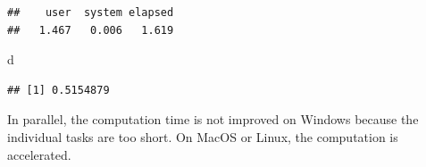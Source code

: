 \documentclass[
  12pt,
  american,
  a4paper,
  extrafontsizes,onecolumn,openright
  ]{memoir}
\newenvironment{Shaded}{\begin{snugshade}}{\end{snugshade}}
\newcommand{\ControlFlowTok}[1]{\textcolor[rgb]{0.13,0.29,0.53}{\textbf{#1}}}
\newcommand{\DecValTok}[1]{\textcolor[rgb]{0.00,0.00,0.81}{#1}}
\newcommand{\FunctionTok}[1]{\textcolor[rgb]{0.13,0.29,0.53}{\textbf{#1}}}
\newcommand{\NormalTok}[1]{#1}
\newcommand{\OtherTok}[1]{\textcolor[rgb]{0.56,0.35,0.01}{#1}}
\newcommand{\SpecialCharTok}[1]{\textcolor[rgb]{0.81,0.36,0.00}{\textbf{#1}}}
\begin{document}
\scriptsize

\begin{Shaded}
\end{Shaded}

\begin{verbatim}
##    user  system elapsed 
##   1.467   0.006   1.619
\end{verbatim}

\begin{Shaded}
\begin{Highlighting}[]
\NormalTok{d}
\end{Highlighting}
\end{Shaded}

\begin{verbatim}
## [1] 0.5154879
\end{verbatim}

\normalsize

In parallel, the computation time is not improved on Windows because the individual tasks are too short.
On MacOS or Linux, the computation is accelerated.
\end{document}
